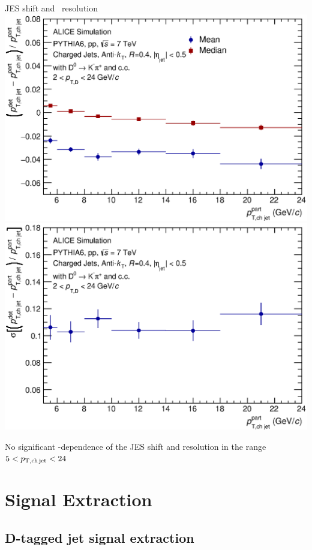 \documentclass[xcolor={usenames,dvipsnames}]{beamer}
\begin{document}
\begin{frame}{JES shift and \pt\ resolution}
\smallskip
\centering
\includegraphics[width=.36\textwidth]{img/HQ16_Simulation_EnergyScaleShift}\quad
\includegraphics[width=.36\textwidth]{img/HQ16_Simulation_Resolution}

\alert{No significant \pt-dependence} of the JES shift and resolution in the range $5<p_{\mathrm{T,ch\, jet}}<24$~\GeVc
\end{frame}

\section{Signal Extraction}

\subsection{D-tagged jet signal extraction}
\end{document}
